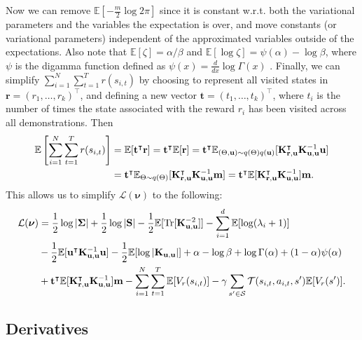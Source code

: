 \documentclass{mprop}
\theoremstyle{definition}
\DeclareMathOperator{\Tr}{Tr}
\begin{document}
Now we can remove $\mathbb{E}\left[-\frac{m}{2}\log2\pi\right]$ since it is
constant w.r.t. both the variational parameters and the variables the
expectation is over, and move constants (or variational parameters) independent
of the approximated variables outside of the expectations. Also note that
$\mathbb{E}[\zeta] = \alpha/\beta$ and
$\mathbb{E}[\log \zeta] = \psi(\alpha) - \log \beta$, where $\psi$ is the
digamma function defined as $\psi(x) = \frac{d}{dx}\log\Gamma(x)$
\cite{DBLP:books/lib/Bishop07}. Finally, we can simplify
$\sum_{i=1}^N\sum_{t=1}^Tr(s_{i,t})$ by choosing to represent all visited states
in $\mathbf{r} = (r_1, \dots, r_k)^\intercal$, and defining a new vector
$\mathbf{t} = (t_1, \dots, t_k)^\intercal$, where $t_i$ is the number of times
the state associated with the reward $r_i$ has been visited across all
demonstrations. Then
\begin{align*}
\mathbb{E} \left[ \sum_{i=1}^N\sum_{t=1}^Tr(s_{i,t}) \right] &=
    \mathbb{E}[\mathbf{t}^\intercal\mathbf{r}] =
    \mathbf{t}^\intercal\mathbb{E}[\mathbf{r}] =
    \mathbf{t}^\intercal\mathbb{E}_{(\Theta, \mathbf{u}) \sim
  q(\Theta)q(\mathbf{u})}[\mathbf{K}_{\mathbf{r},\mathbf{u}}^\intercal\mathbf{K}_{\mathbf{u},\mathbf{u}}^{-1}\mathbf{u}] \\
  &= \mathbf{t}^\intercal\mathbb{E}_{\Theta \sim q(\Theta)}[\mathbf{K}_{\mathbf{r},\mathbf{u}}^\intercal\mathbf{K}_{\mathbf{u},\mathbf{u}}^{-1}\mathbf{m}] = \mathbf{t}^\intercal\mathbb{E}[\mathbf{K}_{\mathbf{r},\mathbf{u}}^\intercal\mathbf{K}_{\mathbf{u},\mathbf{u}}^{-1}]\mathbf{m}.
\end{align*}
This allows us to simplify $\mathcal{L}(\bm\nu)$ to the following:
\begin{align*}
  \mathcal{L}(\bm\nu) &= \frac{1}{2}\log|\bm\Sigma| + \frac{1}{2}\log|\mathbf{S}| - \frac{1}{2} \mathbb{E}[\Tr[\Kuu^{-2}]] -
    \sum_{i=1}^d \mathbb{E}[\log(\lambda_i + 1)] \\
  &- \frac{1}{2}\mathbb{E}[\mathbf{u}^\intercal\Kuu^{-1}\mathbf{u}] - \frac{1}{2}\mathbb{E}[\log|\Kuu|] + \alpha - \log\beta + \log\Gamma(\alpha) + (1 - \alpha)\psi(\alpha) \\
  &+ \mathbf{t}^\intercal\mathbb{E}[\Kru^\intercal\Kuu^{-1}]\mathbf{m} - \sum_{i=1}^N \sum_{t=1}^T \mathbb{E}[V_r(s_{i,t})] - \gamma\sum_{s' \in \mathcal{S}} \mathcal{T}(s_{i,t}, a_{i,t}, s')\mathbb{E}[V_r(s')]. \\
\end{align*}

\subsection{Derivatives}
\end{document}
